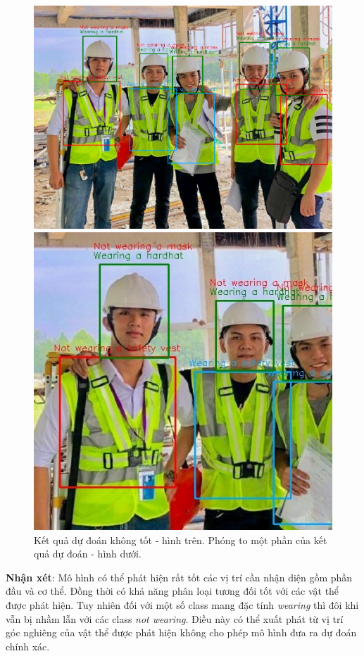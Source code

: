 \begin{figure}[ht!]
	\centerline{\includegraphics[scale=0.3]{images/result_4.jpg}}
	\centerline{\includegraphics[scale=0.6]{images/result_4a.jpg}}
  	\caption{Kết quả dự đoán không tốt - hình trên. Phóng to một phần của kết quả dự đoán - hình dưới.}
  	\label{fig:precision_recall_map}
\end{figure}

\textbf{Nhận xét}: Mô hình có thể phát hiện rất tốt các vị trí cần nhận diện gồm phần đầu và cơ thể. Đồng thời có khả năng phân loại tương đối tốt với các vật thể được phát hiện. Tuy nhiên đối với một số class mang đặc tính \textit{wearing} thì đôi khi vẫn bị nhầm lẫn với các class \textit{not wearing}. Điều này có thể xuất phát từ vị trí góc nghiêng của vật thể được phát hiện không cho phép mô hình đưa ra dự đoán chính xác.